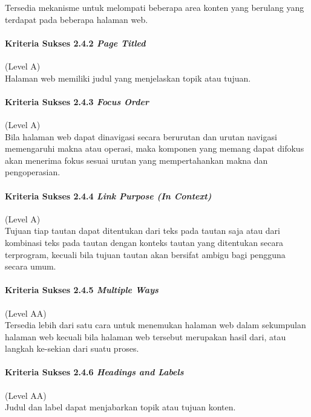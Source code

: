 Tersedia mekanisme untuk melompati beberapa area konten yang berulang yang terdapat pada beberapa halaman web.

\paragraph{Kriteria Sukses 2.4.2 \textit{Page Titled}}
\label{sec:kriteria_sukses_2.4.2}
(Level A)\\

Halaman web memiliki judul yang menjelaskan topik atau tujuan.

\paragraph{Kriteria Sukses 2.4.3 \textit{Focus Order}}
\label{sec:kriteria_sukses_2.4.3}
(Level A)\\

Bila halaman web dapat dinavigasi secara berurutan dan urutan navigasi memengaruhi makna atau operasi, maka komponen yang memang dapat difokus akan menerima fokus sesuai urutan yang mempertahankan makna dan pengoperasian.

\paragraph{Kriteria Sukses 2.4.4 \textit{Link Purpose (In Context)}}
\label{sec:kriteria_sukses_2.4.4}
(Level A)\\

Tujuan tiap tautan dapat ditentukan dari teks pada tautan saja atau dari kombinasi teks pada tautan dengan konteks tautan yang ditentukan secara terprogram, kecuali bila tujuan tautan akan bersifat ambigu bagi pengguna secara umum.

\paragraph{Kriteria Sukses 2.4.5 \textit{Multiple Ways}}
\label{sec:kriteria_sukses_2.4.5}
(Level AA)\\

Tersedia lebih dari satu cara untuk menemukan halaman web dalam sekumpulan halaman web kecuali bila halaman web tersebut merupakan hasil dari, atau langkah ke-sekian dari suatu proses.

\paragraph{Kriteria Sukses 2.4.6 \textit{Headings and Labels}}
\label{sec:kriteria_sukses_2.4.6}
(Level AA)\\
Judul dan label dapat menjabarkan topik atau tujuan konten.

